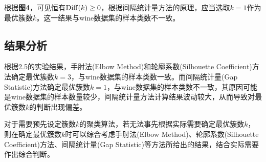 \documentclass[12pt]{article}
\begin{document}
\par
根据\textbf{图4}，可见恒有${\rm Diff}(k)\geq 0$，根据间隔统计量方法的原理，应当选取$k=1$作为最优簇数$k$。这一结果与wine数据集的样本类数不一致。

\subsection{结果分析}
根据2.5的实验结果，手肘法(Elbow Method)和轮廓系数(Silhouette Coefficient)方法确定最优簇数$k=3$，与wine数据集的样本类数一致。而间隔统计量(Gap Statistic)方法确定最优簇数$k=1$，与wine数据集的样本类数不一致，其原因可能是wine数据集的样本数量较少，间隔统计量方法计算结果波动较大，从而导致对最优簇数$k$的判断出现偏差。\par 
对于需要预先设定簇数$k$的聚类算法，若无法事先根据实际需要确定最优簇数$k$，则在确定最优簇数$k$时可以综合考虑手肘法(Elbow Method)、轮廓系数(Silhouette Coefficient)方法、间隔统计量(Gap Statistic)等方法所给出的结果，结合实际需要作出综合判断。

   

\vbox{}



\end{document}
